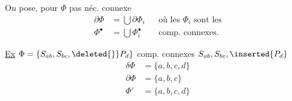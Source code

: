On pose, pour $\Phi$ pas néc. connexe
\[
\begin{aligned}
\partial\Phi&=\bigcup\partial\Phi_i & &\text{où les }\Phi_i\text{ sont les}\\
\Phi^{\bullet}&=\bigcup\Phi_i^{\bullet} & &\text{comp. connexes.}
\end{aligned}
\]

\uline{Ex} $\Phi=\{S_{ab},S_{bc},\deleted{\}}P_d\}$  comp. connexes $S_{ab},S_{bc},\inserted{P_d}$
\[
\begin{aligned}
\delta\Phi&=\{a,b,c,d\}\\
\partial\Phi&=\{a,b,c\}\\
\Phi'&=\{a,b,c,d\}
\end{aligned}
\]
